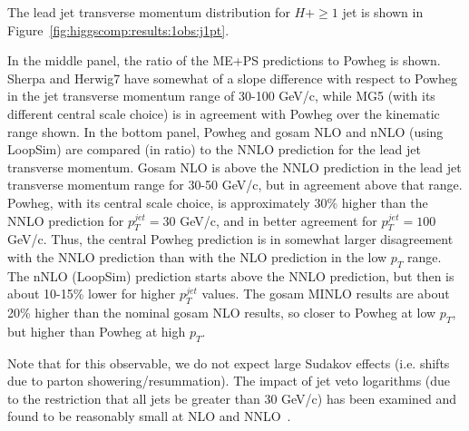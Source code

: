The lead jet transverse momentum distribution for $H+\ge1$ jet is
shown in Figure~\ref{fig:higgscomp:results:1obs:j1pt}.

In the middle panel, the ratio of the ME+PS predictions to Powheg is
shown. Sherpa and Herwig7 have somewhat of a slope difference with
respect to Powheg in the jet transverse momentum range of 30-100
GeV/c, while MG5 (with its different central scale choice) is in
agreement with Powheg over the kinematic range shown.  In the bottom
panel, Powheg and gosam NLO and nNLO (using LoopSim) are compared (in
ratio) to the NNLO prediction for the lead jet transverse
momentum. Gosam NLO is above the NNLO prediction in the lead jet
transverse momentum range for 30-50 GeV/c, but in agreement above that
range. Powheg, with its central scale choice, is approximately 30\%
higher than the NNLO prediction for $p_T^{jet}=30$ GeV/c, and in
better agreement for $p_T^{jet}=100$ GeV/c. Thus, the central Powheg
prediction is in somewhat larger disagreement with the NNLO prediction
than with the NLO prediction in the low $p_T$ range. The nNLO
(LoopSim) prediction starts above the NNLO prediction, but then is
about 10-15\% lower for higher $p_T^{jet}$ values. The gosam MINLO
results are about 20\% higher than the nominal gosam NLO results, so
closer to Powheg at low $p_T$, but higher than Powheg at high $p_T$.

Note that for this observable, we do not expect large Sudakov effects
(i.e. shifts due to parton showering/resummation). The impact of jet
veto logarithms (due to the restriction that all jets be greater than
30 GeV/c) has been examined and found to be reasonably small at NLO
and NNLO~\cite{monni}.


